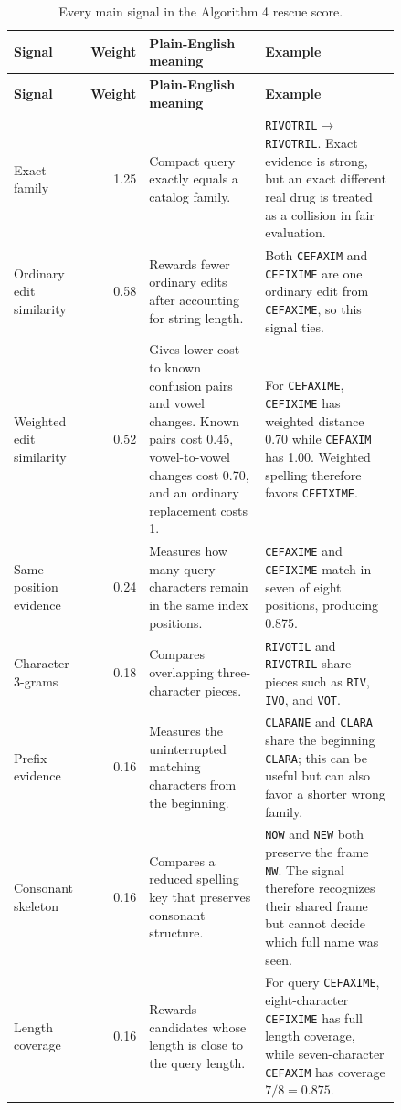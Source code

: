 \documentclass[11pt,a4paper]{article}
\newcommand{\code}[1]{\texttt{#1}}
\begin{document}
\small
\begin{longtable}{@{}L{0.19\linewidth}rL{0.30\linewidth}L{0.35\linewidth}@{}}
\caption{Every main signal in the Algorithm 4 rescue score.}\label{tab:lexical-signals}\\
\toprule
\textbf{Signal} & \textbf{Weight} & \textbf{Plain-English meaning} & \textbf{Example} \\
\midrule
\endfirsthead
\toprule
\textbf{Signal} & \textbf{Weight} & \textbf{Plain-English meaning} & \textbf{Example} \\
\midrule
\endhead
Exact family & 1.25 & Compact query exactly equals a catalog family. & \code{RIVOTRIL}$\rightarrow$\code{RIVOTRIL}. Exact evidence is strong, but an exact different real drug is treated as a collision in fair evaluation. \\
Ordinary edit similarity & 0.58 & Rewards fewer ordinary edits after accounting for string length. & Both \code{CEFAXIM} and \code{CEFIXIME} are one ordinary edit from \code{CEFAXIME}, so this signal ties. \\
Weighted edit similarity & 0.52 & Gives lower cost to known confusion pairs and vowel changes. Known pairs cost 0.45, vowel-to-vowel changes cost 0.70, and an ordinary replacement costs 1. & For \code{CEFAXIME}, \code{CEFIXIME} has weighted distance 0.70 while \code{CEFAXIM} has 1.00. Weighted spelling therefore favors \code{CEFIXIME}. \\
Same-position evidence & 0.24 & Measures how many query characters remain in the same index positions. & \code{CEFAXIME} and \code{CEFIXIME} match in seven of eight positions, producing 0.875. \\
Character 3-grams & 0.18 & Compares overlapping three-character pieces. & \code{RIVOTIL} and \code{RIVOTRIL} share pieces such as \code{RIV}, \code{IVO}, and \code{VOT}. \\
Prefix evidence & 0.16 & Measures the uninterrupted matching characters from the beginning. & \code{CLARANE} and \code{CLARA} share the beginning \code{CLARA}; this can be useful but can also favor a shorter wrong family. \\
Consonant skeleton & 0.16 & Compares a reduced spelling key that preserves consonant structure. & \code{NOW} and \code{NEW} both preserve the frame \code{NW}. The signal therefore recognizes their shared frame but cannot decide which full name was seen. \\
Length coverage & 0.16 & Rewards candidates whose length is close to the query length. & For query \code{CEFAXIME}, eight-character \code{CEFIXIME} has full length coverage, while seven-character \code{CEFAXIM} has coverage $7/8=0.875$. \\

\end{longtable}
\end{document}
